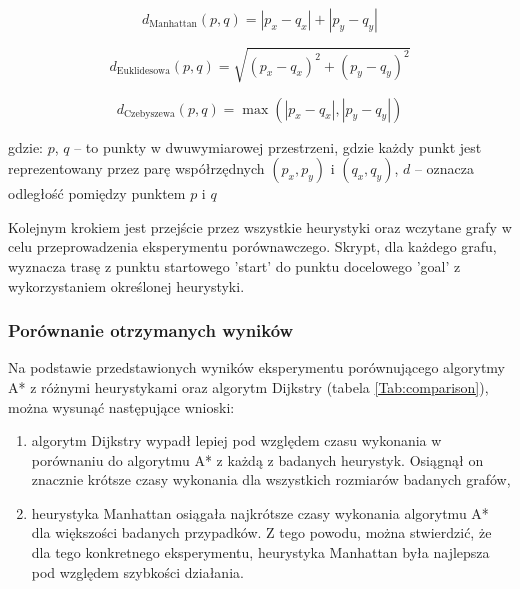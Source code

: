 \documentclass[12pt,twoside]{article}
\begin{document}
\begin{equation}
d_{\text{Manhattan}}(p, q) = |p_x - q_x| + |p_y - q_y|
\label{Eq:manhattan}
\end{equation}

\begin{equation}
d_{\text{Euklidesowa}}(p, q) = \sqrt{(p_x - q_x)^2 + (p_y - q_y)^2}
\label{Eq:euclidean}
\end{equation}

\begin{equation}
d_{\text{Czebyszewa}}(p, q) = \max(|p_x - q_x|, |p_y - q_y|)
\label{Eq:czebyszewa}
\end{equation}

gdzie: $p$, $q$ -- to punkty w dwuwymiarowej przestrzeni, gdzie każdy punkt jest reprezentowany przez parę współrzędnych $(p_x, p_y)$ i $(q_x, q_y)$, $d$ -- oznacza odległość pomiędzy punktem $p$ i $q$ \\

\newpage

Kolejnym krokiem jest przejście przez wszystkie heurystyki oraz wczytane grafy w celu przeprowadzenia eksperymentu porównawczego. Skrypt, dla każdego grafu, wyznacza trasę z punktu startowego 'start' do punktu docelowego 'goal' z wykorzystaniem określonej heurystyki.

\subsubsection{Porównanie otrzymanych wyników}

Na podstawie przedstawionych wyników eksperymentu porównującego algorytmy A* z różnymi heurystykami oraz algorytm Dijkstry (tabela \ref{Tab:comparison}), można wysunąć następujące wnioski:

\begin{enumerate}[label=\alph*), leftmargin=1.25cm]
	\item algorytm Dijkstry wypadł lepiej pod względem czasu wykonania w porównaniu do algorytmu A* z każdą z badanych heurystyk. Osiągnął on znacznie krótsze czasy wykonania dla wszystkich rozmiarów badanych grafów,
	\item heurystyka Manhattan osiągała najkrótsze czasy wykonania algorytmu A* dla większości badanych przypadków. Z tego powodu, można stwierdzić, że dla tego konkretnego eksperymentu, heurystyka Manhattan była najlepsza pod względem szybkości działania.
\end{enumerate}
\end{document}
